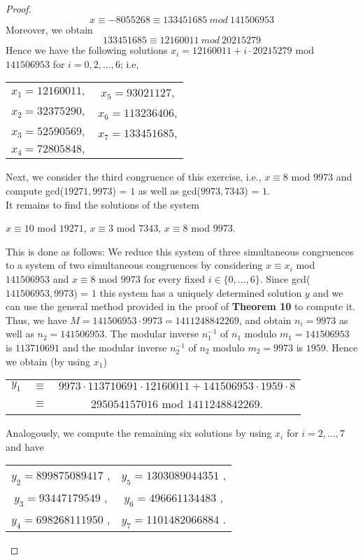 \documentclass[a4paper]{article}
\begin{document}
\begin{proof}
$$x \equiv -8055268 \equiv 133451685\ mod\ 141506953$$
Moreover, we obtain
$$133451685 \equiv 12160011\ mod\ 20215279$$
Hence we have the following solutions $x_{i} = 12160011 + i \cdot 20215279$ mod $141506953$ for $i = 0, 2, \ldots, 6$; i.e,
\begin{center}
\begin{tabular}{c c}
$x_{1} = 12160011,$ & $x_{5} = 93021127$, \\
$x_{2} = 32375290,$ & $x_{6} = 113236406$, \\
$x_{3} = 52590569,$ & $x_{7} = 133451685$, \\
$x_{4} = 72805848,$ &  \\
\end{tabular}
\end{center}
Next, we consider the third congruence of this exercise, i.e., $x \equiv 8$ mod $9973$ and compute gcd($19271, 9973$) = $1$ as well as gcd($9973, 7343$) = $1$.\\
It remains to find the solutions of the system
\begin{center}
$x \equiv 10$ mod $19271$, $x \equiv 3$ mod $7343$, $x \equiv 8$ mod $9973$.
\end{center}
This is done as follows: We reduce this system of three simultaneous congruences to a system of two simultaneous congruences by considering $x \equiv x_{i}$ mod $141506953$ and $x \equiv 8$ mod $9973$ for every fixed $i \in \{0, \ldots, 6\}$. Since gcd($141506953, 9973$) = $1$ this system has a uniquely determined solution $y$ and we can use the general method provided in the proof of \textbf{Theorem 10} to compute it.\\
Thus, we have $M = 141506953 \cdot 9973 = 1411248842269$, and obtain $n_{i} = 9973$ as well as $n_{2} = 141506953$. The modular inverse $n_{1}^{-1}$ of $n_{1}$ modulo $m_{1} = 141506953$ is $113710691$ and the modular inverse $n_{2}^{-1}$ of $n_{2}$ modulo $m_{2} = 9973$ is $1959$. Hence we obtain (by using $x_{1}$)
\begin{center}
\begin{tabular}{c c c}
$y_{1}$ & $\equiv$ & $9973 \cdot 113710691 \cdot 12160011 + 141506953 \cdot 1959 \cdot 8$ \\
& $\equiv$ &  $295054157016$ mod $1411248842269$.
\end{tabular}
\end{center}
Analogously, we compute the remaining six solutions by using $x_{i}$ for $i = 2, \ldots, 7$ and have
\begin{center}
\begin{tabular}{c c}
$y_{2} = 899875089417$ , & $y_{5} = 1303089044351$ , \\
$y_{3} = 93447179549$ , & $y_{6} = 496661134483$ , \\
$y_{4} = 698268111950$ , & $y_{7} = 1101482066884$ .
\end{tabular}
\end{center}
\end{proof}
\end{document}
